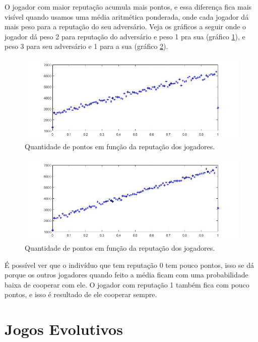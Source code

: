 O jogador com maior reputação acumula mais pontos, e essa diferença fica mais visível quando usamos uma média aritmética ponderada, onde cada jogador dá mais peso para a reputação do seu adversário. Veja os gráficos a seguir onde o jogador dá peso 2 para reputação do adversário e peso 1 pra sua (gráfico \ref{fig12}), e peso 3 para seu adversário e 1 para a sua (gráfico \ref{fig13}).

\begin{figure}[H]
\centering
\includegraphics[width=14cm]{imagens/graf12.jpg}
\caption{Quantidade de pontos em função da reputação dos jogadores.}
\label{fig12}
\end{figure}

\begin{figure}[H]
\centering
\includegraphics[width=14cm]{imagens/graf13.jpg}
\caption{Quantidade de pontos em função da reputação dos jogadores.}
\label{fig13}
\end{figure}

É possível ver que o indivíduo que tem reputação 0 tem pouco pontos, isso se dá porque os outros jogadores quando feito a média ficam com uma probabilidade baixa de cooperar com ele. O jogador com reputação 1 também fica com pouco pontos, e isso 
é resultado de ele cooperar sempre.

\section{Jogos Evolutivos}


